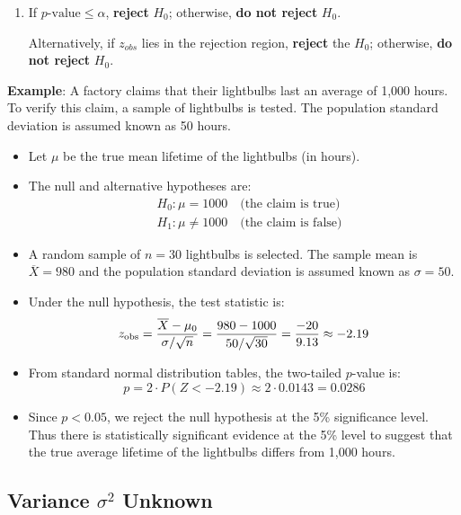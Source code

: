 \documentclass[twoside]{book}
\begin{document}
\begin{enumerate}
	\item If \(p\text{-value} \le \alpha\), \textbf{reject} \(H_0\); otherwise, \textbf{do not reject} \(H_0\).

	Alternatively, if $z_{obs}$ lies in the rejection region, \textbf{reject} the \(H_0\); otherwise, \textbf{do not reject} \(H_0\).
\end{enumerate}

\textbf{Example}: A factory claims that their lightbulbs last an average of 1,000 hours. To verify this claim, a sample of lightbulbs is tested. The population standard deviation is assumed known as 50 hours.

\begin{itemize}
	\item Let \(\mu\) be the true mean lifetime of the lightbulbs (in hours).

	\item The null and alternative hypotheses are:
	\begin{align*}
	&H_0: \mu = 1000 \quad \text{(the claim is true)} \\
	&H_1: \mu \neq 1000 \quad \text{(the claim is false)}
	\end{align*}

	\item A random sample of \(n = 30\) lightbulbs is selected. The sample mean is \(\overline{X} = 980\) and the population standard deviation is assumed known as \(\sigma = 50\).

	\item Under the null hypothesis, the test statistic is:
	\[
	z_{\rm obs} = \dfrac{\overline{X} - \mu_0}{\sigma / \sqrt{n}}
	= \frac{980 - 1000}{50 / \sqrt{30}}
	= \frac{-20}{9.13} \approx -2.19
	\]

	\item From standard normal distribution tables, the two-tailed \(p\)-value is:
	\[
	p = 2 \cdot P(Z < -2.19) \approx 2 \cdot 0.0143 = 0.0286
	\]

	\item Since \(p < 0.05\), we reject the null hypothesis at the 5\% significance level. Thus there is statistically significant evidence at the 5\% level to suggest that the true average lifetime of the lightbulbs differs from 1,000 hours.
\end{itemize}


\subsection{Variance $\sigma^2 $ Unknown}
\end{document}

